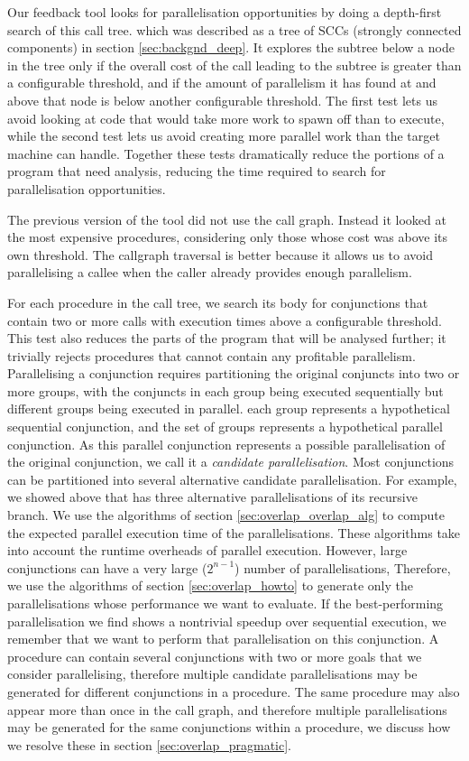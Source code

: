 Our feedback tool looks for parallelisation opportunities
by doing a depth-first search of this call tree.
which was described as a tree of SCCs (strongly connected components)
in section \ref{sec:backgnd_deep}.
It explores the subtree below a node in the tree
only if the overall cost of the call leading to the subtree
is greater than a configurable threshold,
and if the amount of parallelism it has found at and above that node
is below another configurable threshold.
The first test lets us avoid looking at code
that would take more work to spawn off than to execute,
while the second test lets us avoid creating
more parallel work than the target machine can handle.
Together these tests dramatically reduce the portions of a program that need
analysis,
reducing the time required to search for parallelisation opportunities.

The previous version of the tool did not use the call graph.
Instead it looked at the most expensive procedures,
considering only those whose cost was above its own threshold.
The callgraph traversal is better because it allows us to avoid parallelising
a callee when the caller already provides enough parallelism.

For each procedure in the call tree,
we search its body for conjunctions that contain
two or more calls with execution times above a configurable threshold.
This test also reduces the parts of the program that will be analysed
further;
it trivially rejects procedures that cannot contain any profitable
parallelism.
Parallelising a conjunction
requires partitioning the original conjuncts into two or more groups,
with the conjuncts in each group being executed sequentially
but different groups being executed in parallel.
each group represents a hypothetical sequential conjunction,
and the set of groups represents a hypothetical parallel conjunction.
As this parallel conjunction represents a possible parallelisation of the
original conjunction, we call it a \emph{candidate parallelisation}.
Most conjunctions can be partitioned into several alternative candidate
parallelisation.
For example, we showed above that \mapfoldl has three alternative
parallelisations of its recursive branch.
We use the algorithms of section \ref{sec:overlap_overlap_alg}
to compute the expected parallel execution time of the parallelisations.
These algorithms take into account the runtime overheads of parallel execution.
However,
large conjunctions can have a very large ($2^{n-1}$) number of
parallelisations,
Therefore,
we use the algorithms of section \ref{sec:overlap_howto} to generate
only the parallelisations whose performance we want to evaluate.
If the best-performing parallelisation we find
shows a nontrivial speedup over sequential execution,
we remember that we want to perform that parallelisation on this conjunction.
A procedure can contain several conjunctions with two or more goals that we
consider parallelising,
therefore multiple candidate parallelisations may be generated for different
conjunctions in a procedure.
The same procedure may also appear more than once in the call graph,
and therefore multiple parallelisations may be generated for the same
conjunctions within a procedure,
we discuss how we resolve these in section \ref{sec:overlap_pragmatic}.

